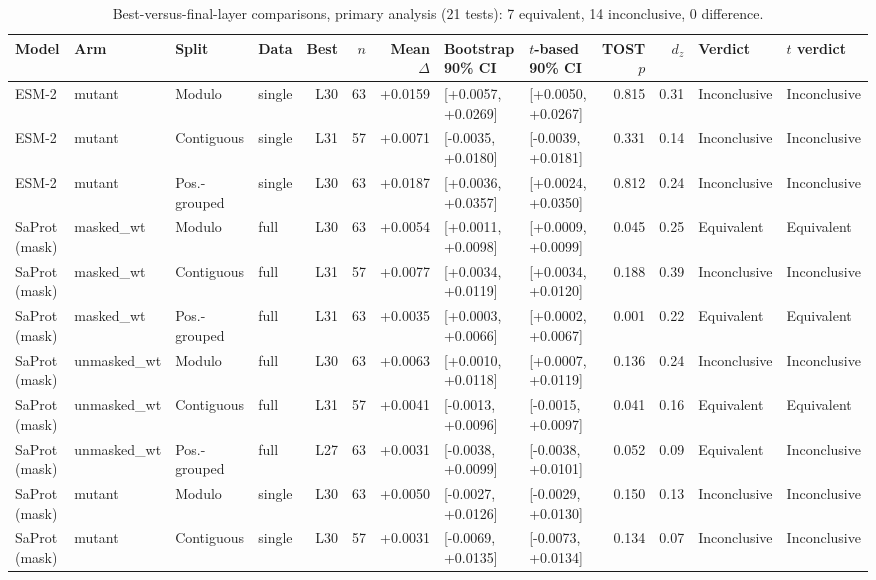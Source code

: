 \documentclass[11pt,a4paper]{article}
\begin{document}
\begin{landscape}\begin{table}[p]\centering\footnotesize\setlength{\tabcolsep}{4pt}
\caption{Best-versus-final-layer comparisons, primary analysis (21 tests): 7 equivalent, 14 inconclusive, 0 difference.}\label{tab:S4}
\begin{tabular}{llllrrrllrrll}
\toprule
Model & Arm & Split & Data & Best & $n$ & Mean $\Delta$ & Bootstrap 90\% CI & $t$-based 90\% CI & TOST $p$ & $d_z$ & Verdict & $t$ verdict \\
\midrule
ESM-2 & mutant & Modulo & single & L30 & 63 & +0.0159 & [+0.0057, +0.0269] & [+0.0050, +0.0267] & 0.815 & 0.31 & Inconclusive & Inconclusive \\
ESM-2 & mutant & Contiguous & single & L31 & 57 & +0.0071 & [-0.0035, +0.0180] & [-0.0039, +0.0181] & 0.331 & 0.14 & Inconclusive & Inconclusive \\
ESM-2 & mutant & Pos.-grouped & single & L30 & 63 & +0.0187 & [+0.0036, +0.0357] & [+0.0024, +0.0350] & 0.812 & 0.24 & Inconclusive & Inconclusive \\
SaProt (mask) & masked\_wt & Modulo & full & L30 & 63 & +0.0054 & [+0.0011, +0.0098] & [+0.0009, +0.0099] & 0.045 & 0.25 & Equivalent & Equivalent \\
SaProt (mask) & masked\_wt & Contiguous & full & L31 & 57 & +0.0077 & [+0.0034, +0.0119] & [+0.0034, +0.0120] & 0.188 & 0.39 & Inconclusive & Inconclusive \\
SaProt (mask) & masked\_wt & Pos.-grouped & full & L31 & 63 & +0.0035 & [+0.0003, +0.0066] & [+0.0002, +0.0067] & 0.001 & 0.22 & Equivalent & Equivalent \\
SaProt (mask) & unmasked\_wt & Modulo & full & L30 & 63 & +0.0063 & [+0.0010, +0.0118] & [+0.0007, +0.0119] & 0.136 & 0.24 & Inconclusive & Inconclusive \\
SaProt (mask) & unmasked\_wt & Contiguous & full & L31 & 57 & +0.0041 & [-0.0013, +0.0096] & [-0.0015, +0.0097] & 0.041 & 0.16 & Equivalent & Equivalent \\
SaProt (mask) & unmasked\_wt & Pos.-grouped & full & L27 & 63 & +0.0031 & [-0.0038, +0.0099] & [-0.0038, +0.0101] & 0.052 & 0.09 & Equivalent & Inconclusive \\
SaProt (mask) & mutant & Modulo & single & L30 & 63 & +0.0050 & [-0.0027, +0.0126] & [-0.0029, +0.0130] & 0.150 & 0.13 & Inconclusive & Inconclusive \\
SaProt (mask) & mutant & Contiguous & single & L30 & 57 & +0.0031 & [-0.0069, +0.0135] & [-0.0073, +0.0134] & 0.134 & 0.07 & Inconclusive & Inconclusive \\

\end{tabular}
\end{table}
\end{landscape}
\end{document}
